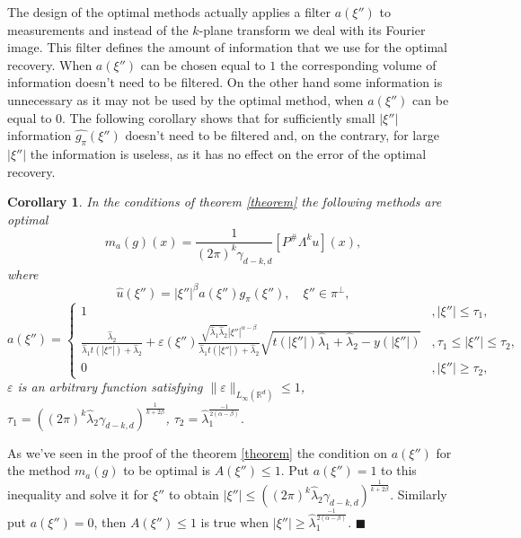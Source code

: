 \documentclass[12pt]{iopart}
\newtheorem{corollary}{Corollary}
\newenvironment{proof}
{\par\noindent{\bf Proof}}
{\hfill$\scriptstyle\blacksquare$}
\begin{document}
	The design of the optimal methods actually applies a filter $a(\xi'')$ to measurements and instead of the $k$-plane transform we deal with its Fourier image. This filter defines the amount of information that we use for the optimal recovery. When $a(\xi'')$ can be chosen equal to $1$ the corresponding volume of information doesn't need to be filtered. On the other hand some information is unnecessary as it may not be used by the optimal method, when $a(\xi'')$ can be equal to $0$. The following corollary shows that for sufficiently small  $|\xi''|$ information $\widehat{g_\pi}(\xi'')$ doesn't need to be filtered and, on the contrary, for large  $|\xi''|$ the information is useless, as it  has no effect on the error of the optimal recovery.
	
	\begin{corollary}
		\label{cor}
		In the conditions of theorem \ref{theorem} the following methods are optimal 
		$$m_a(g)(x) = \frac{1}{(2\pi)^k\gamma_{d-k,d}}[P^\#\Lambda^ku](x),$$
		where	
		$$\widehat{u}(\xi'')=|\xi''|^\beta a(\xi'')\widehat{g_\pi }(\xi''),\quad \xi''\in\pi^\perp,$$
		\[
		a(\xi'')=
		\begin{cases}
		1& ,|\xi''|\leqslant \tau_1,\\
		\frac{\widehat\lambda_2}{\widehat\lambda_1t(|\xi''|)+\widehat\lambda_2}+\varepsilon(\xi'')\frac{\sqrt{\widehat\lambda_1\widehat\lambda_2}|\xi''|^{\alpha-\beta}}{\widehat\lambda_1t(|\xi''|)+\widehat\lambda_2}\sqrt{t(|\xi''|)\widehat\lambda_1+\widehat\lambda_2-y(|\xi''|)}& ,\tau_1 \leqslant|\xi''|\leqslant\tau_2,\\
		0 &,|\xi''|\geqslant\tau_2,
		\end{cases}
		\]
		$\varepsilon$ is an arbitrary function satisfying $\|\varepsilon\|_{L_\infty(\mathbb R^d)}\leqslant 1$, $\tau_1=((2\pi)^k\widehat\lambda_2\gamma_{d-k,d})^\frac{1}{k+2\beta}$, $\tau_2=\widehat\lambda_1^{\frac{-1}{2(\alpha-\beta)}}.$
	\end{corollary}
	
	\begin{proof}
		As we've seen in the proof of the theorem \ref{theorem} the condition on $a(\xi'')$ for the method $m_a(g)$ to be optimal is $A(\xi'')\leqslant 1$. Put $a(\xi'')=1$ to this inequality and solve it for $\xi''$ to obtain $|\xi''|\leqslant ((2\pi)^k\widehat\lambda_2\gamma_{d-k,d})^\frac{1}{k+2\beta}$. Similarly put $a(\xi'')=0$,
		then $A(\xi'')\leqslant 1$ is true when $|\xi''|\geqslant
		\widehat\lambda_1^{\frac{-1}{2(\alpha-\beta)}}$.
	\end{proof}
	
\end{document}
